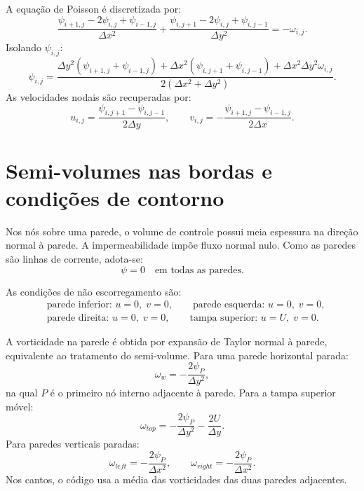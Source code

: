 \documentclass[12pt,a4paper]{article}
\begin{document}
A equação de Poisson é discretizada por:
\begin{equation}
\frac{\psi_{i+1,j}-2\psi_{i,j}+\psi_{i-1,j}}{\Delta x^2}
+
\frac{\psi_{i,j+1}-2\psi_{i,j}+\psi_{i,j-1}}{\Delta y^2}
= -\omega_{i,j}.
\end{equation}
Isolando $\psi_{i,j}$:
\begin{equation}
\psi_{i,j}=\frac{
\Delta y^2(\psi_{i+1,j}+\psi_{i-1,j})+
\Delta x^2(\psi_{i,j+1}+\psi_{i,j-1})+
\Delta x^2\Delta y^2\omega_{i,j}
}{2(\Delta x^2+\Delta y^2)}.
\end{equation}
As velocidades nodais são recuperadas por:
\begin{equation}
u_{i,j}=\frac{\psi_{i,j+1}-\psi_{i,j-1}}{2\Delta y},
\qquad
v_{i,j}=-\frac{\psi_{i+1,j}-\psi_{i-1,j}}{2\Delta x}.
\end{equation}

\section*{Semi-volumes nas bordas e condições de contorno}

Nos nós sobre uma parede, o volume de controle possui meia espessura na direção normal à parede. A impermeabilidade impõe fluxo normal nulo. Como as paredes são linhas de corrente, adota-se:
\begin{equation}
\psi=0 \quad \text{em todas as paredes.}
\end{equation}

As condições de não escorregamento são:
\begin{align}
&\text{parede inferior: } u=0,\;v=0,\qquad
\text{parede esquerda: } u=0,\;v=0,\\
&\text{parede direita: } u=0,\;v=0,\qquad
\text{tampa superior: } u=U,\;v=0.
\end{align}

A vorticidade na parede é obtida por expansão de Taylor normal à parede, equivalente ao tratamento do semi-volume. Para uma parede horizontal parada:
\begin{equation}
\omega_w=-\frac{2\psi_P}{\Delta y^2},
\end{equation}
na qual $P$ é o primeiro nó interno adjacente à parede. Para a tampa superior móvel:
\begin{equation}
\omega_{top}=-\frac{2\psi_P}{\Delta y^2}-\frac{2U}{\Delta y}.
\end{equation}
Para paredes verticais paradas:
\begin{equation}
\omega_{left}=-\frac{2\psi_P}{\Delta x^2},
\qquad
\omega_{right}=-\frac{2\psi_P}{\Delta x^2}.
\end{equation}
Nos cantos, o código usa a média das vorticidades das duas paredes adjacentes.
\end{document}
